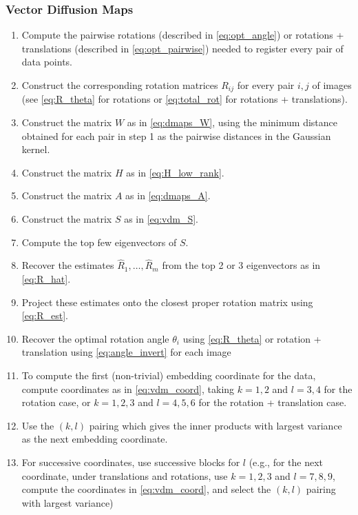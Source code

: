 \documentclass[12pt]{article}
\begin{document}
\subsubsection{Vector Diffusion Maps}

\begin{enumerate}
\item Compute the pairwise rotations (described in \eqref{eq:opt_angle}) or rotations + translations (described in \eqref{eq:opt_pairwise}) needed to register every pair of data points.
%
\item Construct the corresponding rotation matrices $R_{ij}$ for every pair $i, j$ of images (see \eqref{eq:R_theta} for rotations or \eqref{eq:total_rot} for rotations + translations).
%
\item Construct the matrix $W$ as in \eqref{eq:dmaps_W}, using the minimum distance obtained for each pair in step 1 as the pairwise distances in the Gaussian kernel.
%
\item Construct the matrix $H$ as in \eqref{eq:H_low_rank}.
%
\item Construct the matrix $A$ as in \eqref{eq:dmaps_A}.
%
\item Construct the matrix $S$ as in \eqref{eq:vdm_S}.
%
\item Compute the top few eigenvectors of $S$.
%
\item Recover the estimates $\hat{R}_1, \dots, \hat{R}_m$ from the top 2 or 3 eigenvectors as in \eqref{eq:R_hat}.
%
\item Project these estimates onto the closest proper rotation matrix using \eqref{eq:R_est}.
%
\item Recover the optimal rotation angle $\theta_i$ using \eqref{eq:R_theta} or rotation + translation using \eqref{eq:angle_invert} for each image
%
\item To compute the first (non-trivial) embedding coordinate for the data, compute coordinates as in \eqref{eq:vdm_coord}, taking $k=1, 2$ and $l=3, 4$ for the rotation case, or $k = 1, 2, 3$ and $l = 4, 5, 6$ for the rotation + translation case.
%
\item Use the $(k, l)$ pairing which gives the inner products with largest variance as the next embedding coordinate.
%
\item For successive coordinates, use successive blocks for $l$ (e.g., for the next coordinate, under translations and rotations, use $k=1, 2, 3$ and $l = 7, 8, 9$, compute the coordinates in \eqref{eq:vdm_coord}, and select the $(k, l)$ pairing with largest variance)

\end{enumerate}
\end{document}
